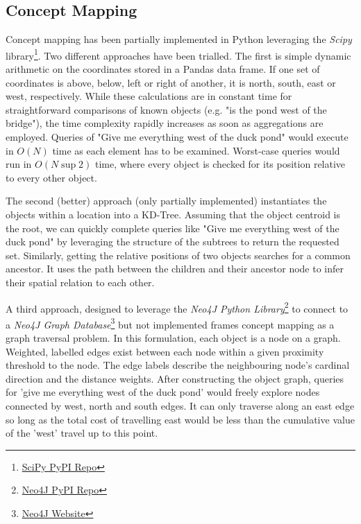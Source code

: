 \subsection{Concept Mapping}
Concept mapping has been partially implemented in Python leveraging the \textit{Scipy} library\footnote{\href{https://pypi.org/project/scipy/}{SciPy PyPI Repo}}. Two different approaches have been trialled. 
The first is simple dynamic arithmetic on the coordinates stored in a Pandas data frame. If one set of coordinates is above, below, left or right of another, it is north, south, east or west, respectively. 
While these calculations are in constant time for straightforward comparisons of known objects (e.g. "is the pond west of the bridge"), the time complexity rapidly increases as soon as aggregations are employed. 
Queries of "Give me everything west of the duck pond" would execute in $O(N)$ time as each element has to be examined. Worst-case queries would run in $O(N\sup{2})$ time, where every object is checked for its position relative to every other object. 

The second (better) approach (only partially implemented) instantiates the objects within a location into a KD-Tree. 
Assuming that the object centroid is the root, we can quickly complete queries like "Give me everything west of the duck pond" by leveraging the structure of the subtrees to return the requested set. 
Similarly, getting the relative positions of two objects searches for a common ancestor. It uses the path between the children and their ancestor node to infer their spatial relation to each other.

A third approach, designed to leverage the \textit{Neo4J Python Library}\footnote{\href{https://pypi.org/project/neo4j/}{Neo4J PyPI Repo}} to connect to a \textit{Neo4J Graph Database}\footnote{\href{https://neo4j.com/}{Neo4J Website}} but not implemented frames concept mapping as a graph traversal problem. 
In this formulation, each object is a node on a graph. Weighted, labelled edges exist between each node within a given proximity threshold to the node. 
The edge labels describe the neighbouring node's cardinal direction and the distance weights. 
After constructing the object graph, queries for 'give me everything west of the duck pond' would freely explore nodes connected by west, north and south edges. 
It can only traverse along an east edge so long as the total cost of travelling east would be less than the cumulative value of the 'west' travel up to this point. 

